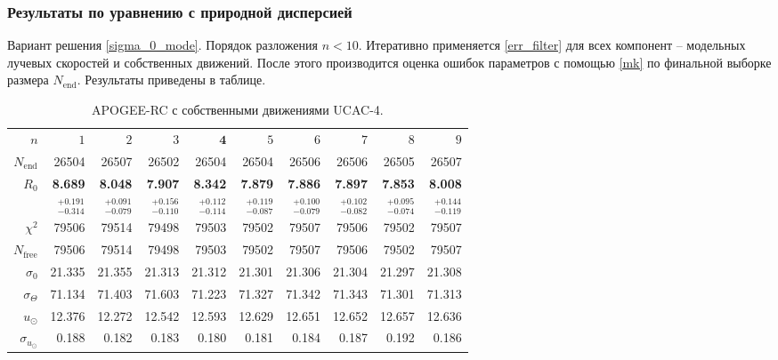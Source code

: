 \documentclass{matmex-diploma-custom}
\begin{document}
\pagebreak


\subsubsection{Результаты по уравнению с природной дисперсией}
Вариант решения \ref{sigma_0_mode}. Порядок разложения $n < 10$. Итеративно применяется \ref{err_filter} для всех компонент -- модельных лучевых скоростей и собственных движений. После этого производится оценка ошибок параметров с помощью \ref{mk} по финальной выборке размера $N_{\mathrm{end}}$. Результаты приведены в таблице. 
\begin{table}[h!!]
\centering
\caption{APOGEE-RC с собственными движениями UCAC-4.}
\begin{tabular}{r|rrrrrrrrr}
\hline
$n$ & $1$ & $2$ & $3$ & $\textbf{4}$ & $5$&$ 6 $&$ 7 $&$ 8 $&$ 9 $\\
 $N_{\mathrm{end}}$ & 26504       &   26507 &   26502 &   26504 &   26504 &   26506 &   26506 &   26505 &   26507 \\
 $R_0 $& \textbf{8.689}       &   \textbf{8.048} &   \textbf{7.907} &   \textbf{8.342} &   \textbf{7.879} &   \textbf{7.886} &   \textbf{7.897} &   \textbf{7.853} &   \textbf{8.008} \\
       & $_{-0.314}^{+0.191} $ & $_{-0.079}^{+0.091}$ & $_{-0.110}^{+0.156}$   & $_{-0.114}^{+0.112}$  & $_{-0.087}^{+0.119}$  & $_{-0.079}^{+0.100}$  & $_{-0.082}^{+0.102}$  & $_{-0.074}^{+0.095}$  & $_{-0.119}^{+0.144}$  \\\hline
 $\chi^2 $& 79506   &   79514 &   79498 &   79503 &   79502 &   79507 &   79506 &   79502 &   79507 \\
 $N_{\mathrm{free}} $& 79506      &  79514 &   79498 &   79503 &   79502 &   79507 &   79506 &   79502 &   79507 \\
 $\sigma_0 $& 21.335      &  21.355 &  21.313 &  21.312 &  21.301 &  21.306 &  21.304 &  21.297 &  21.308  \\ 
 $\sigma_{\Theta} $& 71.134      &  71.403 &  71.603 &  71.223 &  71.327 &  71.342 &  71.343 &  71.301 &  71.313  \\\hline 
 $ u_{\odot} $& 12.376      &  12.272 &  12.542 &  12.593 &  12.629 &  12.651 &  12.652 &  12.657 &  12.636 \\
 $\sigma_{u_{\odot}} $&0.188       &   0.182 &   0.183 &    0.180 &   0.181 &   0.184 &   0.187 &   0.192 &   0.186 \\

\end{tabular}
\end{table}
\end{document}
